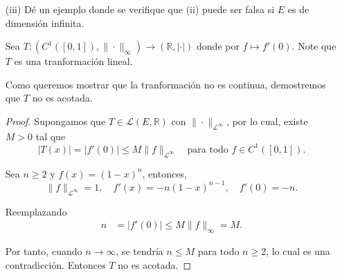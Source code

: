 \begin{enumerate}
\begin{proof}
    Como $E$ es un espacio vectorial de dimensión finita, tomemos la base de $E$ como $\mathcal{B}=\{v_1,v_2,\dots, v_n\}$, luego si $x\in E$ tenemos que $x=\displaystyle\sum_{i=1}^{n}x_iv_i$, entonces la transformación lineal T es de la forma,
      \begin{align*}
           Tx&=T\left( \displaystyle\sum_{i=1}^{n} x_i v_i\right) \\
           &=\displaystyle\sum_{i=1}^{n} x_i T(v_i),\\
           &=\displaystyle\sum_{i=1}^{n} x_i v_i \max_{\substack{1\leq i\leq n}} T(v_i),
        \end{align*} 
    luego, tenemos que
    \begin{align*}
\|T\|_E 
&= \left\|\sum_{i=1}^{n} x_i T(v_i)\right\|_E\\
&\leq \sum_{i=1}^{n} \left\|x_i T(v_i)\right\|_E\\
&= \sum_{i=1}^{n} |x_i| \cdot \|T(v_i)\|_E,
\end{align*}
 por el punto anterior, como $E$ es un espacio de dimensión finita existen constantes positivas $C_1$ y $C_2$, tal que $C_1\|x\|_E\leq\|x\|_1\leq C_2\|x\|_E$ y si tomamos a $M_1=\max_{\substack{1\leq i\leq n}} \|T(v_i)\|_E$, entonces,
 \begin{align*}
     \sum_{i=1}^{n} |x_i| \cdot \|T(v_i)\|_E&= \|x\|_1 \max_{\substack{1\leq i \leq n}} \|T(v_i)\|_E,\\
     &\leq M_1 C_2\|x\|_E\\
     &=M \|x\|_E,
 \end{align*}
 por lo cual, T es acotado y continuo.
    \end{proof}
    \item[(iii)] Dé un ejemplo donde se verifique que (ii) puede ser falsa si $E$ es de dimensión infinita.
    \begin{sol}
    Sea $
T: (C^1([0,1]), \|\cdot\|_{\infty}) \longrightarrow (\mathbb{R}, |\cdot|)
$
donde por $f \mapsto f'(0)$. Note que $T$ es una tranformación lineal.

Como queremos mostrar que la tranformación no es continua, demostremos que $T$ no es acotada.
\begin{proof}

Supongamos que $T \in \mathcal{L}(E, \mathbb{R})$ con $\|\cdot\|_{\mathcal{L}^\infty}$, por lo cual,  existe $M > 0$ tal que 
$$
|T(x)| = |f'(0)| \leq M \|f\|_{\mathcal{L}^\infty }\quad \text{para todo } f \in C^1([0,1]).
$$

Sea $n \geq 2$ y $f(x) = (1 - x)^n$, entonces,
$$
\|f\|_{\mathcal{L}^\infty} = 1, \quad f'(x) = -n(1 - x)^{n - 1}, \quad f'(0) = -n.
$$

Reemplazando
\begin{align*}
n &= |f'(0)| \leq M \|f\|_\infty = M.
\end{align*}

Por tanto, cuando $n \to \infty$, se tendría $n \leq M$ para todo $n \geq 2$, lo cual es una contradicción. Entonces $T$ no es acotada.

\end{proof}
        
    \end{sol}
\end{enumerate}
\newpage

